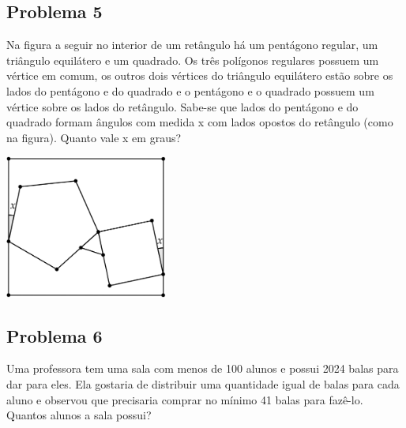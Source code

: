 \documentclass[12pt]{article}
\begin{document}
\clearpage

\subsection{Problema 5}
\begin{tcolorbox}[statementbox]
Na figura a seguir no interior de um retângulo há um pentágono regular, um triângulo equilátero e um
quadrado. Os três polígonos regulares possuem um vértice em comum, os outros dois vértices do triângulo
equilátero estão sobre os lados do pentágono e do quadrado e o pentágono e o quadrado possuem um vértice
sobre os lados do retângulo. Sabe-se que lados do pentágono e do quadrado formam ângulos com medida x
com lados opostos do retângulo (como na figura). Quanto vale x em graus?
\begin{center}
  \includegraphics[width=0.4\textwidth]{second.png}
\end{center}
\end{tcolorbox}

\clearpage

\subsection{Problema 6}
\begin{tcolorbox}[statementbox]
Uma professora tem uma sala com menos de 100 alunos e possui 2024 balas para dar para eles. Ela gostaria
de distribuir uma quantidade igual de balas para cada aluno e observou que precisaria comprar no mínimo 41
balas para fazê-lo. Quantos alunos a sala possui?
\end{tcolorbox}

\clearpage
\end{document}
